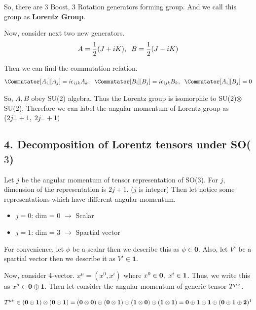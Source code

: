 \documentclass[11pt,letterpaper]{article}
\begin{document}
\VS

So, there are 3 Boost, 3 Rotation generators forming group. And we call this group as \textbf{Lorentz Group}.

Now, consider next two new generators.
\begin{equation}
 A = \frac{1}{2}(J+iK)\Com \hs B=\frac{1}{2}(J-iK)
\end{equation}

Then we can find the commutation relation.
\begin{equation}
 \Commutator[A_i][A_j] = i\eps_{ijk}A_k\Com\hs \Commutator[B_i][B_j]=i\eps_{ijk}B_k\Com\hs\Commutator[A_i][B_j]=0
\end{equation}

So, $A,B$ obey SU($2$) algebra. Thus the Lorentz group is isomorphic to SU($2$)$\otimes$SU($2$). Therefore we can label
the angular momentum of Lorentz group as $(2j_+ + 1,\hspace{0.1cm} 2j_- + 1)$

\newpage

\subsection*{4. Decomposition of Lorentz tensors under SO($3$)}

Let $j$ be the angular momentum of tensor representation of SO($3$). For $j$, dimension of the representation is $2j+1$. ($j$ is integer) 
Then let notice some representations which have different angular momentum.
\begin{itemize}
 \item $j = 0$: dim = 0 $\rightarrow$ Scalar
 \item $j = 1$: dim = 3 $\rightarrow$ Spartial vector
\end{itemize}
For convenience, let $\phi$ be a scalar then we describe this as $\phi \in \mathbf{0}$. Also, let $V^i$ be a spartial vector then we describe it as $V^i \in \mathbf{1}$.

Now, consider 4-vector. $x^\mu = (x^0, x^i)$ where $x^0 \in \mathbf{0},\hspace{0.1cm} x^i \in \mathbf{1}$. Thus, we write this as $x^\mu \in \mathbf{0} \oplus \mathbf{1}$.
Then let consider the angular momentum of generic tensor $\tensor{T}{^\mu ^\nu}$.

\begin{equation}
 \tensor{T}{^\mu ^\nu} \in (\mathbf{0}\oplus\mathbf{1})\otimes(\mathbf{0}\oplus\mathbf{1}) = (\mathbf{0}\otimes\mathbf{0})\oplus(\mathbf{0}\otimes\mathbf{1})
 \oplus(\mathbf{1}\otimes\mathbf{0})\oplus(\mathbf{1}\otimes\mathbf{1}) = \mathbf{0}\oplus\mathbf{1}\oplus\mathbf{1}\oplus(\mathbf{0}\oplus\mathbf{1}\oplus\mathbf{2})
 \footnotemark[1]
\end{equation}
\end{document}

